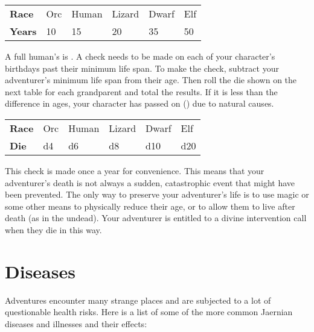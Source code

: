 \begin{multicols}{2}
\begin{normboxc}
\begin{tabular}{@{}l| l l l l l}
\textbf{Race} & Orc & Human & Lizard & Dwarf & Elf\\
\textbf{Years} & 10 & 15 & 20 & 35 & 50\\
\end{tabular}
\end{normboxc}

 A full human's  is . A check needs to be made on each of your character's birthdays past their minimum life span. To make the check, subtract your adventurer's minimum life span from their age. Then roll the die shown on the next table for each grandparent and total the results. If it is less than the difference in ages, your character has passed on () due to natural causes.\\
\begin{normboxc}
\begin{tabular}{@{}l| l l l l l}
\textbf{Race} & Orc & Human & Lizard & Dwarf & Elf\\
\textbf{Die} & d4 & d6 & d8 & d10 & d20\\
\end{tabular}
\end{normboxc}


This check is made once a year for convenience. This means that your adventurer's death is not always a sudden, catastrophic event that might have been prevented. The only way to preserve your adventurer's life is to use magic or some other means to physically reduce their age, or to allow them to live after death (as in the undead). Your adventurer is entitled to a divine intervention call when they die in this way.
\section{Diseases}
Adventures encounter many strange places and are subjected to a lot of questionable health risks. Here is a list of some of the more common Jaernian diseases and illnesses and their effects:


\end{multicols}
